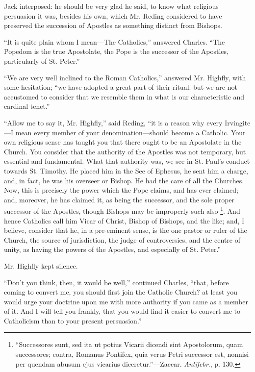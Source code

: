 Jack interposed: he should be very glad he said, to know what
religious persuasion it was, besides his own, which Mr. Reding
considered to have preserved the succession of Apostles as something
distinct from Bishops.

``It is quite plain whom I mean—The Catholics,'' answered
Charles. ``The Popedom is the true Apostolate, the Pope is the
successor of the Apostles, particularly of St. Peter.''

``We are very well inclined to the Roman Catholics,''
answered Mr. Highfly, with some hesitation; ``we have adopted a
great part of their ritual: but we are not accustomed to consider that
we resemble them in what is our characteristic and cardinal
tenet.''

``Allow me to say it, Mr. Highfly,'' said Reding, ``it
is a reason why every Irvingite—I mean every member of your
denomination—should become a Catholic. Your own religious sense has
taught you that there ought to be an Apostolate in the Church. You
consider that the authority of the Apostles was not temporary,
but essential and fundamental. What that authority was, we see in St.
Paul's conduct towards St. Timothy. He placed him in the See of
Ephesus, he sent him a charge, and, in fact, he was his overseer or
Bishop. He had the care of all the Churches. Now, this is precisely
the power which the Pope claims, and has ever claimed; and, moreover,
he has claimed it, as being the successor, and the sole proper
successor of the Apostles, though Bishops may be improperly such also
\footnote{``Successores sunt, sed ita ut potius Vicarii dicendi sint
Apostolorum, quam successores; contra, Romanus Pontifex, quia verus
Petri successor est, nonnisi per quendam abusum ejus vicarius
diceretur.''—Zaccar. \emph{Antifebr}., p. 130.}. And hence Catholics call
him Vicar of Christ, Bishop of Bishops, and the like; and, I believe,
consider that he, in a pre-eminent sense, is the one pastor or ruler
of the Church, the source of jurisdiction, the judge of controversies,
and the centre of unity, as having the powers of the Apostles, and
especially of St. Peter.''

Mr. Highfly kept silence.

``Don't you think, then, it would be well,'' continued
Charles, ``that, before coming to convert me, you should first
join the Catholic Church? at least you would urge your doctrine upon
me with more authority if you came as a member of it. And I will tell
you frankly, that you would find it easier to convert me to
Catholicism than to your present persuasion.''

